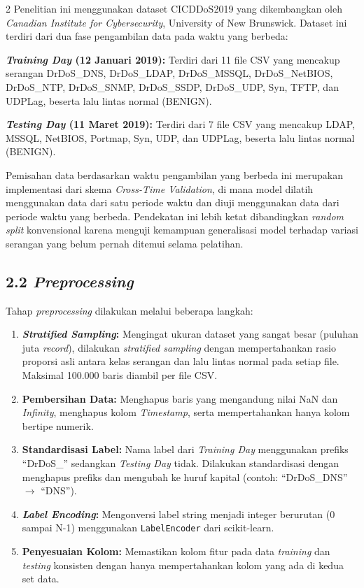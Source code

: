 \documentclass[10pt,a4paper]{article}
\begin{document}
\begin{multicols}{2}
Penelitian ini menggunakan dataset CICDDoS2019 yang dikembangkan oleh \textit{Canadian Institute for Cybersecurity}, University of New Brunswick. Dataset ini terdiri dari dua fase pengambilan data pada waktu yang berbeda:

\textbf{\textit{Training Day} (12 Januari 2019):} Terdiri dari 11 file CSV yang mencakup serangan DrDoS\_DNS, DrDoS\_LDAP, DrDoS\_MSSQL, DrDoS\_NetBIOS, DrDoS\_NTP, DrDoS\_SNMP, DrDoS\_SSDP, DrDoS\_UDP, Syn, TFTP, dan UDPLag, beserta lalu lintas normal (BENIGN).

\textbf{\textit{Testing Day} (11 Maret 2019):} Terdiri dari 7 file CSV yang mencakup LDAP, MSSQL, NetBIOS, Portmap, Syn, UDP, dan UDPLag, beserta lalu lintas normal (BENIGN).

Pemisahan data berdasarkan waktu pengambilan yang berbeda ini merupakan implementasi dari skema \textit{Cross-Time Validation}, di mana model dilatih menggunakan data dari satu periode waktu dan diuji menggunakan data dari periode waktu yang berbeda. Pendekatan ini lebih ketat dibandingkan \textit{random split} konvensional karena menguji kemampuan generalisasi model terhadap variasi serangan yang belum pernah ditemui selama pelatihan.

\subsection*{2.2 \textit{Preprocessing}}

Tahap \textit{preprocessing} dilakukan melalui beberapa langkah:

\begin{enumerate}
\item \textbf{\textit{Stratified Sampling}:} Mengingat ukuran dataset yang sangat besar (puluhan juta \textit{record}), dilakukan \textit{stratified sampling} dengan mempertahankan rasio proporsi asli antara kelas serangan dan lalu lintas normal pada setiap file. Maksimal 100.000 baris diambil per file CSV.
\item \textbf{Pembersihan Data:} Menghapus baris yang mengandung nilai NaN dan \textit{Infinity}, menghapus kolom \textit{Timestamp}, serta mempertahankan hanya kolom bertipe numerik.
\item \textbf{Standardisasi Label:} Nama label dari \textit{Training Day} menggunakan prefiks ``DrDoS\_'' sedangkan \textit{Testing Day} tidak. Dilakukan standardisasi dengan menghapus prefiks dan mengubah ke huruf kapital (contoh: ``DrDoS\_DNS'' $\rightarrow$ ``DNS'').
\item \textbf{\textit{Label Encoding}:} Mengonversi label string menjadi integer berurutan (0 sampai N-1) menggunakan \texttt{LabelEncoder} dari scikit-learn.
\item \textbf{Penyesuaian Kolom:} Memastikan kolom fitur pada data \textit{training} dan \textit{testing} konsisten dengan hanya mempertahankan kolom yang ada di kedua set data.
\end{enumerate}


\end{multicols}
\end{document}
